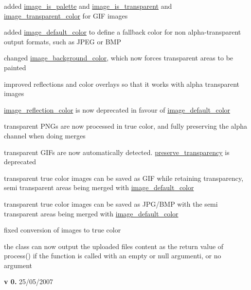 \begin{DoxyItemize}
\begin{DoxyItemize}
\item added \hyperlink{}{image\+\_\+is\+\_\+palette} and \hyperlink{}{image\+\_\+is\+\_\+transparent} and \hyperlink{}{image\+\_\+transparent\+\_\+color} for G\+I\+F images~\newline

\item added \hyperlink{}{image\+\_\+default\+\_\+color} to define a fallback color for non alpha-\/transparent output formats, such as J\+P\+E\+G or B\+M\+P~\newline

\item changed \hyperlink{}{image\+\_\+background\+\_\+color}, which now forces transparent areas to be painted~\newline

\item improved reflections and color overlays so that it works with alpha transparent images~\newline

\item \hyperlink{}{image\+\_\+reflection\+\_\+color} is now deprecated in favour of \hyperlink{}{image\+\_\+default\+\_\+color}~\newline

\item transparent P\+N\+Gs are now processed in true color, and fully preserving the alpha channel when doing merges~\newline

\item transparent G\+I\+Fs are now automatically detected. \hyperlink{}{preserve\+\_\+transparency} is deprecated~\newline

\item transparent true color images can be saved as G\+I\+F while retaining transparency, semi transparent areas being merged with \hyperlink{}{image\+\_\+default\+\_\+color}~\newline

\item transparent true color images can be saved as J\+P\+G/\+B\+M\+P with the semi transparent areas being merged with \hyperlink{}{image\+\_\+default\+\_\+color}~\newline

\item fixed conversion of images to true color~\newline

\item the class can now output the uploaded files content as the return value of process() if the function is called with an empty or null argumenti, or no argument 
\end{DoxyItemize}
\item {\bfseries v 0.} 25/05/2007~\newline


\end{DoxyItemize}
